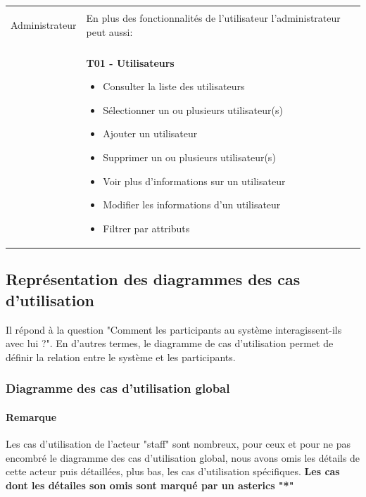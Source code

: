 \begin{longtable}{|Z{3cm}|L{10cm}|}
    \hline & \\ Administrateur & 
    En plus des fonctionnalités de l'utilisateur l'administrateur peut aussi:\\
    & \\ &
    \textbf{T01 - Utilisateurs}
    \begin{itemize}
        \item Consulter la liste des utilisateurs
        \item Sélectionner un ou plusieurs utilisateur(s)
        \item Ajouter un utilisateur
        \item Supprimer un ou plusieurs utilisateur(s)
        \item Voir plus d'informations sur un utilisateur
        \item Modifier les informations d'un utilisateur
        \item Filtrer par attributs
    \end{itemize}
\end{longtable}

\subsection{Représentation des diagrammes des cas d'utilisation}
Il répond à la question "Comment les participants au système interagissent-ils avec lui ?". En d'autres termes, le diagramme de cas d'utilisation permet de définir la relation entre le système et les participants.

\subsubsection{Diagramme des cas d’utilisation global}
\paragraph*{Remarque} Les cas d'utilisation de l'acteur "staff" sont nombreux, pour ceux et pour ne pas encombré le diagramme des cas d'utilisation global, nous avons omis les détails de cette acteur puis détaillées, plus bas, les cas d'utilisation spécifiques. \textbf{Les cas dont les détailes son omis sont marqué par un asterics "*"}\\

